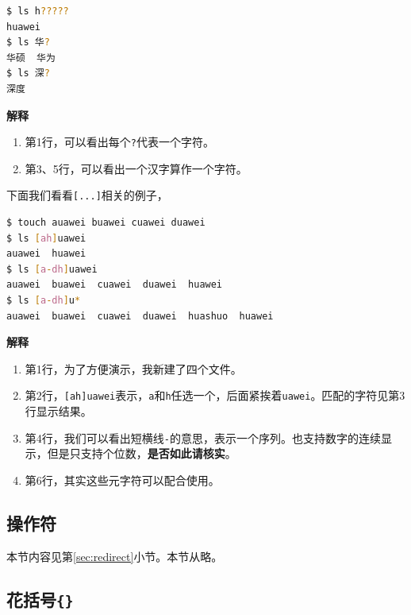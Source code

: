 \documentclass[doctor,openright,twoside]{sjtuthesis}
\providecommand{\tightlist}{%
    \setlength{\itemsep}{0pt}\setlength{\parskip}{0pt}}
\newcommand{\passthrough}[1]{#1}
\theoremstyle{plain}
\theoremstyle{definition}
\theoremstyle{remark}
\theoremstyle{ocrenumbox}
\theoremstyle{plain}
\begin{document}
\begin{lstlisting}[language=bash]
$ ls h?????
huawei
$ ls 华?
华硕  华为
$ ls 深?
深度
\end{lstlisting}

\textbf{解释}

\begin{enumerate}
\def\labelenumi{\arabic{enumi}.}
\tightlist
\item
  第1行，可以看出每个\passthrough{\lstinline!?!}代表一个字符。
\item
  第3、5行，可以看出一个汉字算作一个字符。
\end{enumerate}

下面我们看看\passthrough{\lstinline![...]!}相关的例子，

\begin{lstlisting}[language=bash]
$ touch auawei buawei cuawei duawei
$ ls [ah]uawei
auawei  huawei
$ ls [a-dh]uawei
auawei  buawei  cuawei  duawei  huawei
$ ls [a-dh]u*
auawei  buawei  cuawei  duawei  huashuo  huawei
\end{lstlisting}

\textbf{解释}

\begin{enumerate}
\def\labelenumi{\arabic{enumi}.}
\tightlist
\item
  第1行，为了方便演示，我新建了四个文件。
\item
  第2行，\passthrough{\lstinline![ah]uawei!}表示，\passthrough{\lstinline!a!}和\passthrough{\lstinline!h!}任选一个，后面紧挨着\passthrough{\lstinline!uawei!}。匹配的字符见第3行显示结果。
\item
  第4行，我们可以看出短横线\passthrough{\lstinline!-!}的意思，表示一个序列。也支持数字的连续显示，但是只支持个位数，\textbf{是否如此请核实}。
\item
  第6行，其实这些元字符可以配合使用。
\end{enumerate}

\hypertarget{section-61}{%
\subsection{操作符}\label{section-61}}

本节内容见第\ref{sec:redirect}小节。本节从略。

\hypertarget{section-62}{%
\subsection{\texorpdfstring{花括号\texttt{\{\}}}{花括号\{\}}}\label{section-62}}
\end{document}
